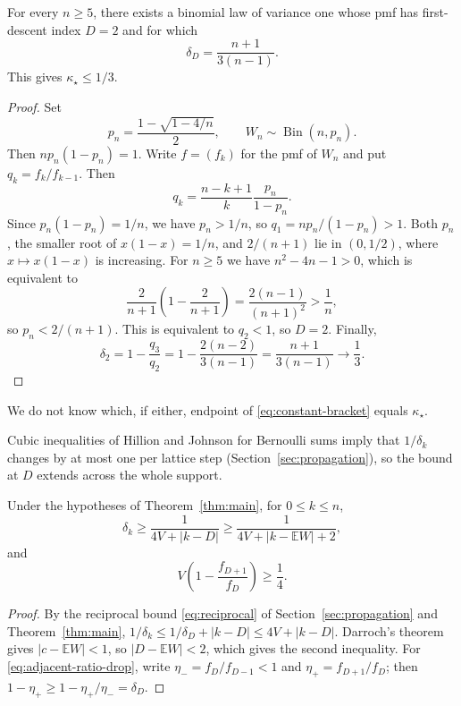 \documentclass[ECP,preprint]{ejpecp}
\begin{document}
\begin{proposition}\label{prop:one-third}
  For every $n\geq5$, there exists a binomial law of variance one whose pmf has
  first-descent index $D=2$ and for which
  \[
    \delta_D=\frac{n+1}{3(n-1)}.
  \]
  This gives $\kappa_\star\leq1/3$.
\end{proposition}

\begin{proof}
  Set
  \[
    p_n=\frac{1-\sqrt{1-4/n}}2,
    \qquad W_n\sim\operatorname{Bin}(n,p_n).
  \]
  Then $np_n(1-p_n)=1$. Write $f=(f_k)$ for the pmf of $W_n$ and put
  $q_k=f_k/f_{k-1}$. Then
  \[
    q_k=\frac{n-k+1}{k}\frac{p_n}{1-p_n}.
  \]
  Since $p_n(1-p_n)=1/n$, we have $p_n>1/n$, so $q_1=np_n/(1-p_n)>1$.
  Both $p_n$, the smaller root of $x(1-x)=1/n$, and $2/(n+1)$ lie in
  $(0,1/2)$, where $x\mapsto x(1-x)$ is increasing. For $n\geq5$ we have
  $n^2-4n-1>0$, which is equivalent to
  \[
    \frac{2}{n+1}\left(1-\frac{2}{n+1}\right)
    =\frac{2(n-1)}{(n+1)^2}>\frac1n,
  \]
  so $p_n<2/(n+1)$. This is equivalent to $q_2<1$, so $D=2$. Finally,
  \[
    \delta_2=1-\frac{q_3}{q_2}
    =1-\frac{2(n-2)}{3(n-1)}
    =\frac{n+1}{3(n-1)}\longrightarrow\frac13.
  \]
\end{proof}

We do not know which, if either, endpoint of \eqref{eq:constant-bracket}
equals $\kappa_\star$.

Cubic inequalities of Hillion and Johnson \cite{hillionjohnson2016} for
Bernoulli sums imply that $1/\delta_k$ changes by at most one per lattice step
(Section~\ref{sec:propagation}), so the bound at $D$ extends across the whole
support.

\begin{corollary}\label{cor:support}
  Under the hypotheses of Theorem~\ref{thm:main}, for $0\leq k\leq n$,
  \begin{equation}\label{eq:support-bound}
    \delta_k\geq\frac1{4V+|k-D|}\geq\frac1{4V+|k-\mathbb EW|+2},
  \end{equation}
  and
  \begin{equation}\label{eq:adjacent-ratio-drop}
    V\left(1-\frac{f_{D+1}}{f_D}\right)\geq\frac14.
  \end{equation}
\end{corollary}

\begin{proof}
  By the reciprocal bound \eqref{eq:reciprocal} of
  Section~\ref{sec:propagation} and Theorem~\ref{thm:main},
  $1/\delta_k\leq1/\delta_D+|k-D|\leq4V+|k-D|$. Darroch's theorem gives
  $|c-\mathbb EW|<1$, so $|D-\mathbb EW|<2$, which gives the second
  inequality. For \eqref{eq:adjacent-ratio-drop}, write
  $\eta_-=f_D/f_{D-1}<1$ and $\eta_+=f_{D+1}/f_D$; then
  $1-\eta_+\geq1-\eta_+/\eta_-=\delta_D$.
\end{proof}
\end{document}
